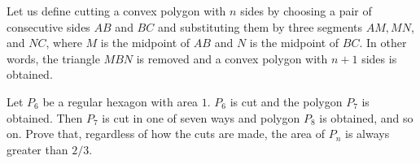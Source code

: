 Let us define cutting a convex polygon with $n$ sides by choosing a pair of consecutive sides $AB$ and $BC$ and substituting them by three segments $AM, MN$,  and $NC$,  where $M$ is the midpoint of $AB$ and $N$ is the midpoint of $BC$. In other words, the triangle $MBN$ is removed and a convex polygon with $n+1$ sides is obtained.

Let $P_6$ be a regular hexagon with area $1$. $P_6$ is cut and the polygon $P_7$ is obtained. Then $P_7$ is cut in one of seven ways and polygon $P_8$ is obtained, and so on. Prove that, regardless of how the cuts are made, the area of $P_n$ is always greater than $2/3$.